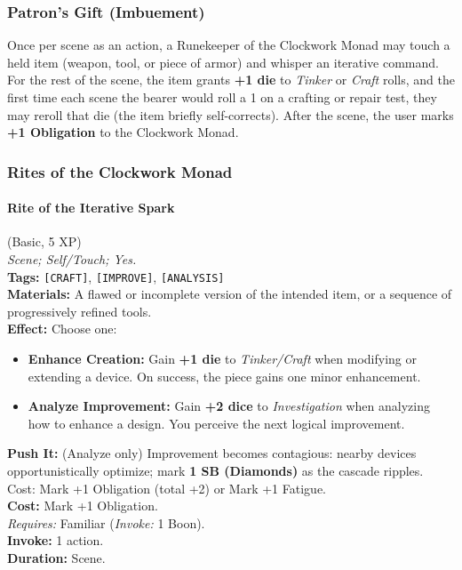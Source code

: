 \subsubsection*{Patron's Gift (Imbuement)}

Once per scene as an action, a Runekeeper of the Clockwork Monad may touch a held item (weapon, tool, or piece of armor) and whisper an iterative command. For the rest of the scene, the item grants \textbf{+1 die} to \textit{Tinker} or \textit{Craft} rolls, and the first time each scene the bearer would roll a 1 on a crafting or repair test, they may reroll that die (the item briefly self-corrects). After the scene, the user marks \textbf{+1 Obligation} to the Clockwork Monad.

\subsubsection*{Rites of the Clockwork Monad}

\paragraph{Rite of the Iterative Spark} (Basic, 5 XP) \hfill \\
\emph{Scene; Self/Touch; Yes.} \\
\textbf{Tags:} \texttt{[CRAFT]}, \texttt{[IMPROVE]}, \texttt{[ANALYSIS]} \\
\textbf{Materials:} A flawed or incomplete version of the intended item, or a sequence of progressively refined tools. \\
\textbf{Effect:} Choose one:
\begin{itemize}
  \item \textbf{Enhance Creation:} Gain \textbf{+1 die} to \textit{Tinker/Craft} when modifying or extending a device. On success, the piece gains one minor enhancement.
  \item \textbf{Analyze Improvement:} Gain \textbf{+2 dice} to \textit{Investigation} when analyzing how to enhance a design. You perceive the next logical improvement.
\end{itemize}
\textbf{Push It:} (Analyze only) Improvement becomes contagious: nearby devices opportunistically optimize; mark \textbf{1 SB (Diamonds)} as the cascade ripples. Cost: Mark +1 Obligation (total +2) or Mark +1 Fatigue. \\
\textbf{Cost:} Mark +1 Obligation. \\
\textit{Requires:} Familiar (\textit{Invoke:} 1 Boon). \\
\textbf{Invoke:} 1 action. \\
\textbf{Duration:} Scene.

